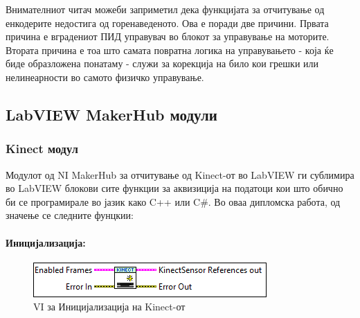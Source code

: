 \documentclass[12pt]{article}
\begin{document}

    Внимателниот читач можеби заприметил дека функцијата за отчитување од енкодерите недостига од горенаведеното. Ова е поради две причини. Првата причина е вградениот ПИД управувач во блокот за управување на моторите. Втората причина е тоа што самата повратна логика на управувањето - која ќе биде образложена понатаму - служи за корекција на било кои грешки или нелинеарности во самото физичко управување.

  \subsection{LabVIEW MakerHub модули}
    \subsubsection{Kinect модул}
      Модулот од NI MakerHub за отчитување од Kinect-от во LabVIEW ги сублимира во LabVIEW блокови сите функции за аквизиција на податоци кои што обично би се програмирале во јазик како C++ или C\#. Во оваа дипломска работа, од значење се следните фунцкии:

      \paragraph{Иницијализација:\\}
	\begin{figure}[H]
	    \includegraphics[width=0.55\linewidth]{./images/kinect_init_border.PNG}
	    \caption{VI за Иницијализација на Kinect-от}
		\label{fig:kinect_init.PNG}
	    \raggedright
	    \end{figure}
\end{document}
